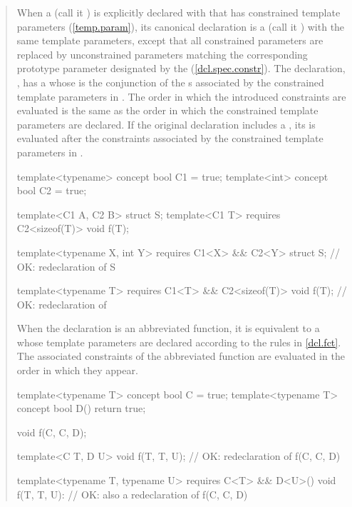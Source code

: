 \begin{quote}
\pnum
When a  (call it ) is
explicitly declared with 
that has constrained template parameters (\ref{temp.param}), 
its canonical declaration is a 
 (call it )
with the same template parameters,
except that all constrained parameters are replaced by unconstrained
parameters matching the corresponding prototype parameter designated
by the  
(\ref{dcl.spec.constr}).
% 
The declaration, , has a 
whose  is the
conjunction of the s 
associated by the constrained template parameters in .
% 
The order in which the introduced constraints are evaluated is 
the same as the order in which the constrained template 
parameters are declared.
% 
If the original declaration  includes a 
, its
 is evaluated after 
the constraints associated by the constrained template parameters in
.
% 
\enterexample
\begin{codeblock}
template<typename> concept bool C1 = true;
template<int> concept bool C2 = true;

template<C1 A, C2 B> struct S;
template<C1 T> requires C2<sizeof(T)> void f(T);

template<typename X, int Y> 
  requires C1<X> && C2<Y>
    struct S; // OK: redeclaration of S

template<typename T> 
  requires C1<T> && C2<sizeof(T)>
    void f(T); // OK: redeclaration of 
\end{codeblock}
\exitexample

\pnum
When the declaration is an abbreviated function, it is 
equivalent to a 
whose template parameters are declared according to the rules in
\ref{dcl.fct}. The associated constraints of the
abbreviated function are evaluated in the order in which they appear.
% 
\enterexample
\begin{codeblock}
template<typename T> concept bool C = true;
template<typename T> concept bool D() { return true; }

void f(C, C, D);

template<C T, D U> 
  void f(T, T, U);   // OK: redeclaration of f(C, C, D)

template<typename T, typename U>
  requires C<T> && D<U>()
    void f(T, T, U): // OK: also a redeclaration of f(C, C, D)
\end{codeblock}
\exitexample



\end{quote}

